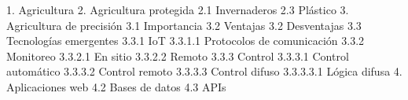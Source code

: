







1. Agricultura
2. Agricultura protegida %
    2.1 Invernaderos
        2.3 Plástico
3. Agricultura de precisión
    3.1 Importancia
    3.2 Ventajas
    3.2 Desventajas %
    3.3 Tecnologías emergentes
        3.3.1 IoT %
            3.3.1.1 Protocolos de comunicación
        3.3.2 Monitoreo
            3.3.2.1 En sitio
            3.3.2.2 Remoto
        3.3.3 Control
            3.3.3.1 Control automático
            3.3.3.2 Control remoto
            3.3.3.3 Control difuso
                3.3.3.3.1 Lógica difusa
4. Aplicaciones web %
    4.2 Bases de datos
    4.3 APIs


